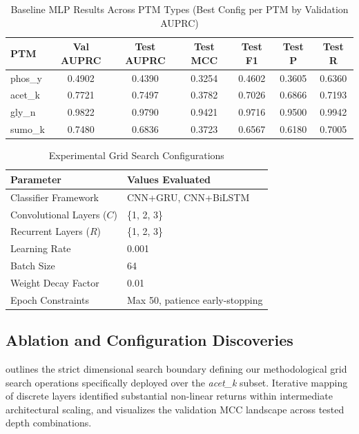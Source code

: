 \documentclass[conference]{IEEEtran}
\begin{document}
\begin{table}[h]
\centering
\caption{Baseline MLP Results Across PTM Types (Best Config per PTM by Validation AUPRC)}
\label{tab:baselineptm}
\scriptsize
\setlength{\tabcolsep}{3.5pt}
\renewcommand{\arraystretch}{1.15}
\begin{tabular}{@{}lcccccc@{}}
\toprule
\textbf{PTM} & \textbf{Val AUPRC} & \textbf{Test AUPRC} & \textbf{Test MCC} & \textbf{Test F1} & \textbf{Test P} & \textbf{Test R} \\ \midrule
phos\_y & 0.4902 & 0.4390 & 0.3254 & 0.4602 & 0.3605 & 0.6360 \\
acet\_k & 0.7721 & 0.7497 & 0.3782 & 0.7026 & 0.6866 & 0.7193 \\
gly\_n  & 0.9822 & 0.9790 & 0.9421 & 0.9716 & 0.9500 & 0.9942 \\
sumo\_k & 0.7480 & 0.6836 & 0.3723 & 0.6567 & 0.6180 & 0.7005 \\
\bottomrule
\end{tabular}
\end{table}

\begin{table}[h]
\centering
\caption{Experimental Grid Search Configurations}
\label{tab:grid}
\begin{tabular}{@{}ll@{}}
\toprule
\textbf{Parameter}         & \textbf{Values Evaluated}               \\ \midrule
Classifier Framework       & CNN+GRU, CNN+BiLSTM                     \\
Convolutional Layers ($C$) & \{1, 2, 3\}                             \\
Recurrent Layers ($R$)     & \{1, 2, 3\}                             \\
Learning Rate              & 0.001                                   \\
Batch Size                 & 64                                      \\
Weight Decay Factor        & 0.01                                    \\
Epoch Constraints          & Max 50, patience early-stopping        \\ \bottomrule
\end{tabular}
\end{table}

\subsection{Ablation and Configuration Discoveries}
 outlines the strict dimensional search boundary defining our methodological grid search operations specifically deployed over the \textit{acet\_k} subset. Iterative mapping of discrete layers identified substantial non-linear returns within intermediate architectural scaling, and  visualizes the validation MCC landscape across tested depth combinations.
\end{document}
